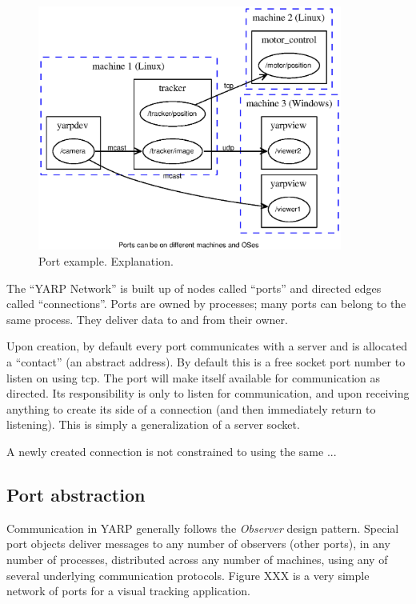 \begin{figure}[t]
\centerline{
\includegraphics[width=10cm]{fig-ports}
}
\caption{
%
Port example.  Explanation.
%
}
\end{figure}


The ``YARP Network'' is built up of nodes called
``ports'' and directed edges called ``connections''.
Ports are owned by processes; many ports can belong to the same
process.  They deliver data to and from their owner.

Upon creation, by default every port communicates with a server and is
allocated a ``contact'' (an abstract address).  By default this is a
free socket port number to listen on using tcp.  The port will make
itself available for communication as directed.  Its responsibility
is only to listen for communication, and upon receiving anything
to create its side of a connection (and then immediately return 
to listening).  This is simply a generalization of a server socket.

A newly created connection is not constrained to using the
same ...





\subsection{Port abstraction}

Communication in YARP generally follows the {\it Observer} design
pattern. Special port objects deliver messages to any number of
observers (other ports), in any number of processes, distributed
across any number of machines, using any of several underlying
communication protocols. Figure XXX is a very simple network of ports
for a visual tracking application.

